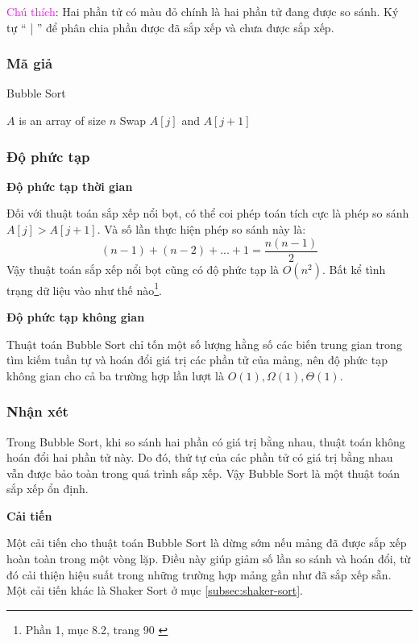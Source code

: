 \textcolor{magenta}{Chú thích}: Hai phần tử có màu đỏ chính là hai phần tử đang được so sánh. Ký tự “ | ” để phân chia phần được đã sắp xếp và chưa được sắp xếp.

\subsubsection{Mã giả}
 
\begin{algorithm}[H]
\caption{Bubble Sort}
\label{alg:bubble-sort}
\begin{algorithmic}

\Require $A$ is an array of size $n$
 
     
         
            \State Swap $A[j]$ and $A[j+1]$ 
        \EndIf
    \EndFor
\EndFor
\EndFunction

\end{algorithmic}
\end{algorithm}

\subsubsection{Độ phức tạp}
 
\textbf{Độ phức tạp thời gian}

Đối với thuật toán sắp xếp nổi bọt, có thể coi phép toán tích cực là phép so sánh $A[j] > A[j + 1]$. Và số lần thực hiện phép so sánh này là:
$$(n-1)+(n-2)+...+1 = \frac{n(n-1)}{2}$$
Vậy thuật toán sắp xếp nổi bọt cũng có độ phức tạp là $O(n^2)$. Bất kể tình trạng dữ liệu vào như thế nào\footnote{Phần 1, mục 8.2, trang 90 \cite{hoang1999giaithuat}}. 

\textbf{Độ phức tạp không gian}

Thuật toán Bubble Sort chỉ tốn một số lượng hằng số các biến trung gian trong tìm kiếm tuần tự và hoán đổi giá trị các phần tử của mảng, nên độ phức tạp không gian cho cả ba trường hợp lần lượt là $O(1), \Omega(1), \Theta(1)$.


\subsubsection{Nhận xét}

Trong Bubble Sort, khi so sánh hai phần có giá trị bằng nhau, thuật toán không hoán đổi hai phần tử này. Do đó, thứ tự của các phần tử có giá trị bằng nhau vẫn được bảo toàn trong quá trình sắp xếp. Vậy Bubble Sort là một thuật toán sắp xếp ổn định.

\textbf{Cải tiến}

Một cải tiến cho thuật toán Bubble Sort là dừng sớm nếu mảng đã được sắp xếp hoàn toàn trong một vòng lặp. Điều này giúp giảm số lần so sánh và hoán đổi, từ đó cải thiện hiệu suất trong những trường hợp mảng gần như đã sắp xếp sẵn.
Một cải tiến khác là Shaker Sort ở mục \ref{subsec:shaker-sort}.
